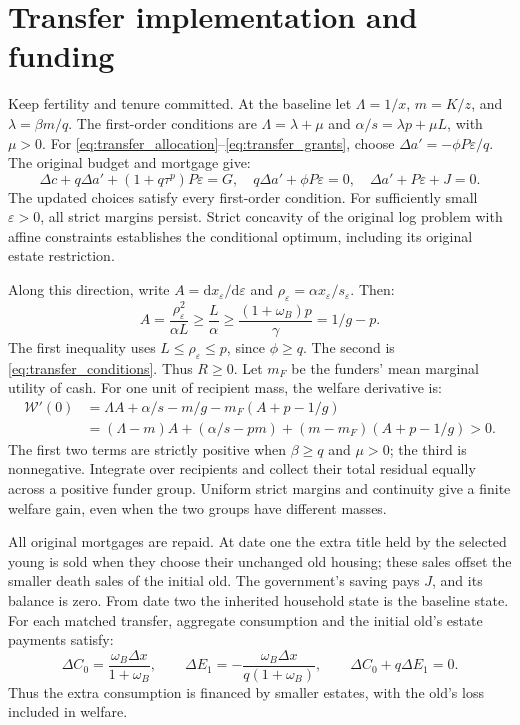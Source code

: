 \documentclass[11pt]{article}
\newcommand{\dd}{\mathrm d}
\begin{document}
\section{Transfer implementation and funding}
\label{app:transfers}

Keep fertility and tenure committed. At the baseline let
$\Lambda=1/x$, $m=K/z$, and $\lambda=\beta m/q$. The first-order
conditions are $\Lambda=\lambda+\mu$ and
$\alpha/s=\lambda p+\mu L$, with $\mu>0$.
For \eqref{eq:transfer_allocation}--\eqref{eq:transfer_grants}, choose
$\Delta a'=-\phi P\varepsilon/q$. The original budget and mortgage give:
\begin{equation}
\Delta c+q\Delta a'+(1+q\tau^p)P\varepsilon=G,
\quad q\Delta a'+\phi P\varepsilon=0,
\quad \Delta a'+P\varepsilon+J=0.
\end{equation}
The updated choices satisfy every first-order condition. For sufficiently
small $\varepsilon>0$, all strict margins persist. Strict concavity of the
original log problem with affine constraints establishes the conditional
optimum, including its original estate restriction.

Along this direction, write $A=\dd x_\varepsilon/\dd\varepsilon$ and
$\rho_\varepsilon=\alpha x_\varepsilon/s_\varepsilon$. Then:
\begin{equation}
A=\frac{\rho_\varepsilon^2}{\alpha L}\ge\frac L\alpha
\ge\frac{(1+\omega_B)p}{\gamma}=1/g-p.
\end{equation}
The first inequality uses $L\le\rho_\varepsilon\le p$, since $\phi\ge q$.
The second is \eqref{eq:transfer_conditions}. Thus $R\ge0$.
Let $m_F$ be the funders' mean marginal utility of cash. For one unit of
recipient mass, the welfare derivative is:
\begin{equation}
\begin{aligned}
\mathcal W'(0)
&=\Lambda A+\alpha/s-m/g-m_F(A+p-1/g)\\
&=(\Lambda-m)A+(\alpha/s-pm)+(m-m_F)(A+p-1/g)>0.
\end{aligned}
\end{equation}
The first two terms are strictly positive when $\beta\ge q$ and $\mu>0$;
the third is nonnegative. Integrate over recipients and collect their total
residual equally across a positive funder group. Uniform strict margins
and continuity give a finite welfare gain, even when the two groups have
different masses.

All original mortgages are repaid. At date one the extra title held by the
selected young is sold when they choose their unchanged old housing; these
sales offset the smaller death sales of the initial old. The government's
saving pays $J$, and its balance is zero. From date two the inherited
household state is the baseline state. For each matched transfer, aggregate
consumption and the initial old's estate payments satisfy:
\begin{equation}
\Delta C_0=\frac{\omega_B\Delta x}{1+\omega_B},\qquad
\Delta E_1=-\frac{\omega_B\Delta x}{q(1+\omega_B)},\qquad
\Delta C_0+q\Delta E_1=0.
\end{equation}
Thus the extra consumption is financed by smaller estates, with the old's
loss included in welfare.
\end{document}
